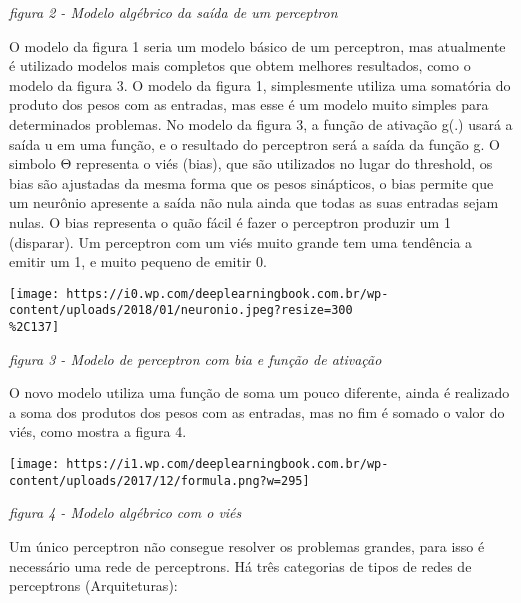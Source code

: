 \documentclass[11pt]{article}
\makeatletter
\def\maxwidth{\ifdim\Gin@nat@width>\linewidth\linewidth
    \else\Gin@nat@width\fi}
\let\Oldincludegraphics\includegraphics
\renewcommand{\includegraphics}[1]{\Oldincludegraphics[width=.8\maxwidth]{#1}}
\makeatother
\begin{document}
\emph{figura 2 - Modelo algébrico da saída de um perceptron}

O modelo da figura 1 seria um modelo básico de um perceptron, mas
atualmente é utilizado modelos mais completos que obtem melhores
resultados, como o modelo da figura 3. O modelo da figura 1,
simplesmente utiliza uma somatória do produto dos pesos com as entradas,
mas esse é um modelo muito simples para determinados problemas. No
modelo da figura 3, a função de ativação g(.) usará a saída u em uma
função, e o resultado do perceptron será a saída da função g. O simbolo
Θ representa o viés (bias), que são utilizados no lugar do threshold, os
bias são ajustadas da mesma forma que os pesos sinápticos, o bias
permite que um neurônio apresente a saída não nula ainda que todas as
suas entradas sejam nulas. O bias representa o quão fácil é fazer o
perceptron produzir um 1 (disparar). Um perceptron com um viés muito
grande tem uma tendência a emitir um 1, e muito pequeno de emitir 0.

\texttt{[image: https://i0.wp.com/deeplearningbook.com.br/wp-content/uploads/2018/01/neuronio.jpeg?resize=300\\\%2C137]}

\emph{figura 3 - Modelo de perceptron com bia e função de ativação}

O novo modelo utiliza uma função de soma um pouco diferente, ainda é
realizado a soma dos produtos dos pesos com as entradas, mas no fim é
somado o valor do viés, como mostra a figura 4.

\texttt{[image: https://i1.wp.com/deeplearningbook.com.br/wp-content/uploads/2017/12/formula.png?w=295]}

\emph{figura 4 - Modelo algébrico com o viés}

Um único perceptron não consegue resolver os problemas grandes, para
isso é necessário uma rede de perceptrons. Há três categorias de tipos
de redes de perceptrons (Arquiteturas):
\end{document}
